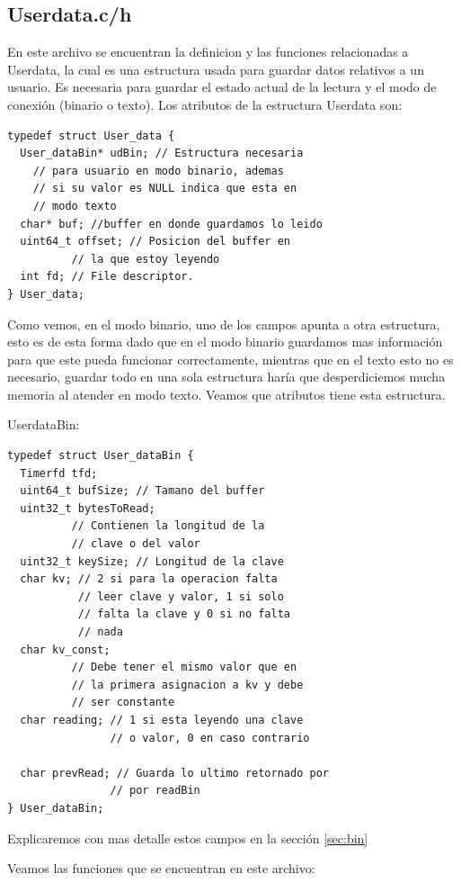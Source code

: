 \documentclass{article}
\begin{document}
\subsection{User\textunderscore data.c/h}
En este archivo se encuentran la definicion y las funciones relacionadas a User\textunderscore data, la cual es una estructura usada para guardar datos relativos a un usuario.
 Es necesaria para guardar el estado actual de la lectura y el modo de conexión (binario o texto).
 Los atributos de la estructura User\textunderscore data son:
\begin{lstlisting}[style=CStyle]
typedef struct User_data {  
  User_dataBin* udBin; // Estructura necesaria
    // para usuario en modo binario, ademas
    // si su valor es NULL indica que esta en
    // modo texto 
  char* buf; //buffer en donde guardamos lo leido  
  uint64_t offset; // Posicion del buffer en
          // la que estoy leyendo
  int fd; // File descriptor.
} User_data;
\end{lstlisting}

Como vemos, en el modo binario, uno de los campos apunta a otra estructura, esto es de esta forma dado que en el modo binario guardamos mas información para que este pueda funcionar correctamente, mientras que en el texto esto no es necesario, guardar todo en una sola estructura haría que desperdiciemos mucha memoria al atender en modo texto. Veamos que atributos tiene esta estructura.

User\textunderscore dataBin:

\begin{lstlisting}[style=CStyle]
    typedef struct User_dataBin {
  Timerfd tfd;
  uint64_t bufSize; // Tamano del buffer
  uint32_t bytesToRead;
          // Contienen la longitud de la 
          // clave o del valor
  uint32_t keySize; // Longitud de la clave
  char kv; // 2 si para la operacion falta 
           // leer clave y valor, 1 si solo
           // falta la clave y 0 si no falta
           // nada
  char kv_const; 
          // Debe tener el mismo valor que en
          // la primera asignacion a kv y debe
          // ser constante 
  char reading; // 1 si esta leyendo una clave
                // o valor, 0 en caso contrario 
  
  char prevRead; // Guarda lo ultimo retornado por
                // por readBin
} User_dataBin;
\end{lstlisting}
Explicaremos con mas detalle estos campos en la sección \ref{sec:bin}

Veamos las funciones que se encuentran en este archivo:
\end{document}
